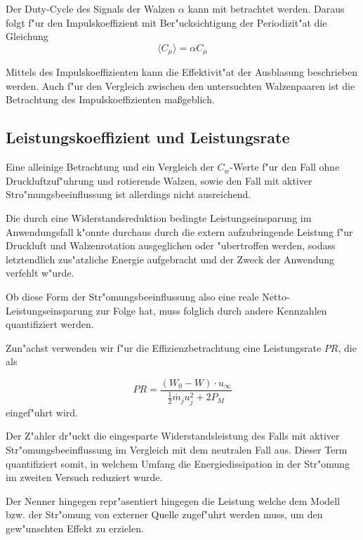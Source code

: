 Der Duty-Cycle des Signals der Walzen $\alpha$ kann mit betrachtet werden. Daraus folgt f"ur den Impulskoeffizient mit Ber"ucksichtigung der Periodizit"at die Gleichung
\begin{equation}
	\label{eq:momentum-coeff-oscill-alpha}
	\langle{C_{\mu}}\rangle = \alpha C_{\mu}
\end{equation}	 



Mittels des Impulskoeffizienten kann die Effektivit"at der Ausblasung beschrieben werden.
Auch f"ur den Vergleich zwischen den untersuchten Walzenpaaren ist die Betrachtung des Impulskoeffizienten ma\ss{}geblich.

\subsection{Leistungskoeffizient und Leistungsrate}
Eine alleinige Betrachtung und ein Vergleich der $C_w$-Werte f"ur den Fall ohne Druckluftzuf"uhrung und rotierende Walzen, sowie den Fall mit aktiver Stro"mungsbeeinflussung ist allerdings nicht ausreichend.

Die durch eine Widerstandsreduktion bedingte Leistungseinsparung im Anwendungsfall k"onnte durchaus durch die extern aufzubringende Leistung f"ur Druckluft und Walzenrotation ausgeglichen oder "ubertroffen werden, sodass letztendlich zus"atzliche Energie aufgebracht und der Zweck der Anwendung verfehlt w"urde.

Ob diese Form der Str"omungsbeeinflussung also eine reale Netto-Leistungseinsparung zur Folge hat, muss folglich durch andere Kennzahlen quantifiziert werden.

Zun"achst verwenden wir f"ur die Effizienzbetrachtung eine Leistungsrate $PR$, die als 

\begin{equation}
	\label{eq:leistungsrate}
	PR = \frac{(W_0 - W)\cdot u_{\infty}}{\frac{1}{2} \dot{m_j} u_j^2 + 2     P_M}
\end{equation}
eingef"uhrt wird.

Der Z"ahler dr"uckt die eingesparte Widerstandsleistung des Falls mit aktiver Str"omungsbeeinflussung im Vergleich mit dem neutralen Fall aus.
Dieser Term quantifiziert somit, in welchem Umfang die Energiedissipation in der Str"omung im zweiten Versuch reduziert wurde.

Der Nenner hingegen repr"asentiert hingegen die Leistung welche dem Modell bzw. der Str"omung von externer Quelle zugef"uhrt werden muss, um den gew"unschten Effekt zu erzielen.

